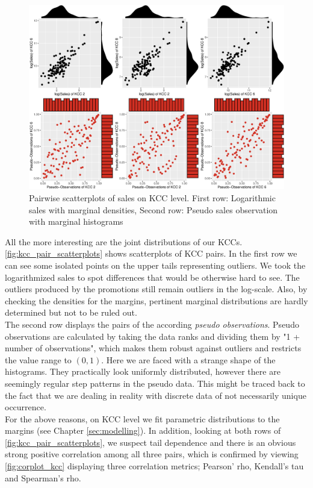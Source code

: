 \begin{figure}[H]
\centering
  \includegraphics[width=0.95\linewidth]{figures/kcc_pair_scatterplots.eps}
  \caption{Pairwise scatterplots of sales on \ac{KCC} level. First row: Logarithmic sales with marginal densities, Second row: Pseudo sales observation with marginal histograms}
  \label{fig:kcc_pair_scatterplots}
\end{figure}


All the more interesting are the joint distributions of our \acp{KCC}. \autoref{fig:kcc_pair_scatterplots} shows scatterplots of \ac{KCC} pairs. In the first row we can see some isolated points on the upper tails representing outliers. We took the logarithmized sales to spot differences that would be otherwise hard to see. The outliers produced by the promotions still remain outliers in the log-scale. Also, by checking the densities for the margins, pertinent marginal distributions are hardly determined but not to be ruled out.\\
The second row displays the pairs of the according \textit{pseudo observations}. Pseudo observations are calculated by taking the data ranks and dividing them by "1 + number of observations", which makes them robust against outliers and restricts the value range to $(0, 1)$. Here we are faced with a strange shape of the histograms. They practically look uniformly distributed, however there are seemingly regular step patterns in the pseudo data. This might be traced back to the fact that we are dealing in reality with discrete data of not necessarily unique occurrence.\\

For the above reasons, on \ac{KCC} level we fit parametric distributions to the margins (see Chapter \ref{sec:modelling}). 
In addition, looking at both rows of \autoref{fig:kcc_pair_scatterplots}, we suspect tail dependence and there is an obvious strong positive correlation among all three pairs, which is confirmed by viewing \autoref{fig:corplot_kcc} displaying three correlation metrics; Pearson' rho, Kendall's tau and Spearman's rho.
 \\


